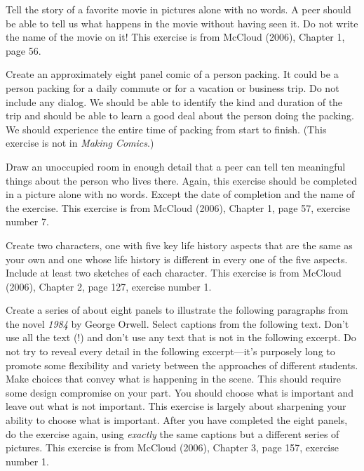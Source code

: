 \hypertarget{favorite-movie}{%
\label{favorite-movie}}

Tell the story of a favorite movie in pictures alone with no words. A
peer should be able to tell us what happens in the movie without having
seen it. Do not write the name of the movie on it! This exercise is from
McCloud (2006), Chapter 1, page 56.

\hypertarget{packing}{%
\label{packing}}

Create an approximately eight panel comic of a person packing. It could
be a person packing for a daily commute or for a vacation or business
trip. Do not include any dialog. We should be able to identify the kind
and duration of the trip and should be able to learn a good deal about
the person doing the packing. We should experience the entire time of
packing from start to finish. (This exercise is not in \emph{Making
Comics}.)

\hypertarget{unoccupied-room}{%
\label{unoccupied-room}}

Draw an unoccupied room in enough detail that a peer can tell ten
meaningful things about the person who lives there. Again, this exercise
should be completed in a picture alone with no words. Except the date of
completion and the name of the exercise. This exercise is from McCloud
(2006), Chapter 1, page 57, exercise number 7.

\hypertarget{two-characters}{%
\label{two-characters}}

Create two characters, one with five key life history aspects that are
the same as your own and one whose life history is different in every
one of the five aspects. Include at least two sketches of each
character. This exercise is from McCloud (2006), Chapter 2, page 127,
exercise number 1.

\hypertarget{captions}{%
\label{captions}}

Create a series of about eight panels to illustrate the following
paragraphs from the novel \emph{1984} by George Orwell. Select captions
from the following text. Don't use all the text (!) and don't use any
text that is not in the following excerpt. Do not try to reveal every
detail in the following excerpt---it's purposely long to promote some
flexibility and variety between the approaches of different students.
Make choices that convey what is happening in the scene. This should
require some design compromise on your part. You should choose what is
important and leave out what is not important. This exercise is largely
about sharpening your ability to choose what is important. After you
have completed the eight panels, do the exercise again, using
\emph{exactly} the same captions but a different series of pictures.
This exercise is from McCloud (2006), Chapter 3, page 157, exercise
number 1.

